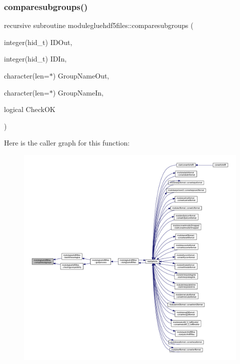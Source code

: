 \subsubsection{\texorpdfstring{comparesubgroups()}{comparesubgroups()}}
{\footnotesize\ttfamily recursive subroutine modulegluehdf5files\+::comparesubgroups (\begin{DoxyParamCaption}\item[{integer(hid\+\_\+t)}]{I\+D\+Out,  }\item[{integer(hid\+\_\+t)}]{I\+D\+In,  }\item[{character(len=$\ast$)}]{Group\+Name\+Out,  }\item[{character(len=$\ast$)}]{Group\+Name\+In,  }\item[{logical}]{Check\+OK }\end{DoxyParamCaption})\hspace{0.3cm}{\ttfamily [private]}}

Here is the caller graph for this function\+:\nopagebreak
\begin{figure}[H]
\begin{center}
\leavevmode
\includegraphics[width=350pt]{namespacemodulegluehdf5files_aeacbdb79a83691a90c236da51ac23775_icgraph}
\end{center}
\end{figure}
\mbox{\label{namespacemodulegluehdf5files_a133e090c390fb1c7e840d7fa26500914}} 
